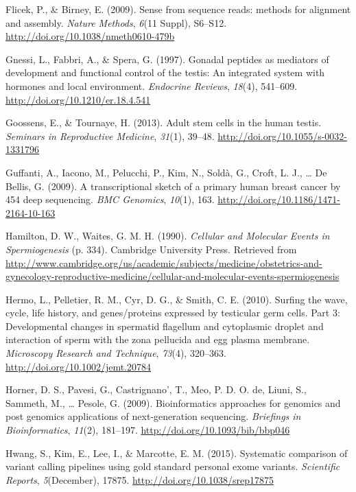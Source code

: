 \documentclass[12pt,twoside]{reedthesis}
\theoremstyle{definition}
\theoremstyle{definition}
\theoremstyle{remark}
\begin{document}
  \hypertarget{ref-Flicek2009}{}
  Flicek, P., \& Birney, E. (2009). Sense from sequence reads: methods for
  alignment and assembly. \emph{Nature Methods}, \emph{6}(11 Suppl),
  S6--S12. \url{http://doi.org/10.1038/nmeth0610-479b}
  
  \hypertarget{ref-Gnessi1997}{}
  Gnessi, L., Fabbri, A., \& Spera, G. (1997). Gonadal peptides as
  mediators of development and functional control of the testis: An
  integrated system with hormones and local environment. \emph{Endocrine
  Reviews}, \emph{18}(4), 541--609.
  \url{http://doi.org/10.1210/er.18.4.541}
  
  \hypertarget{ref-Goossens2013}{}
  Goossens, E., \& Tournaye, H. (2013). Adult stem cells in the human
  testis. \emph{Seminars in Reproductive Medicine}, \emph{31}(1), 39--48.
  \url{http://doi.org/10.1055/s-0032-1331796}
  
  \hypertarget{ref-Guffanti2009}{}
  Guffanti, A., Iacono, M., Pelucchi, P., Kim, N., Soldà, G., Croft, L.
  J., \ldots{} De Bellis, G. (2009). A transcriptional sketch of a primary
  human breast cancer by 454 deep sequencing. \emph{BMC Genomics},
  \emph{10}(1), 163. \url{http://doi.org/10.1186/1471-2164-10-163}
  
  \hypertarget{ref-Hamilton1987}{}
  Hamilton, D. W., Waites, G. M. H. (1990). \emph{Cellular and Molecular
  Events in Spermiogenesis} (p. 334). Cambridge University Press.
  Retrieved from
  \url{http://www.cambridge.org/us/academic/subjects/medicine/obstetrics-and-gynecology-reproductive-medicine/cellular-and-molecular-events-spermiogenesis}
  
  \hypertarget{ref-Hermo2010}{}
  Hermo, L., Pelletier, R. M., Cyr, D. G., \& Smith, C. E. (2010). Surfing
  the wave, cycle, life history, and genes/proteins expressed by
  testicular germ cells. Part 3: Developmental changes in spermatid
  flagellum and cytoplasmic droplet and interaction of sperm with the zona
  pellucida and egg plasma membrane. \emph{Microscopy Research and
  Technique}, \emph{73}(4), 320--363.
  \url{http://doi.org/10.1002/jemt.20784}
  
  \hypertarget{ref-Horner2009}{}
  Horner, D. S., Pavesi, G., Castrignano', T., Meo, P. D. O. de, Liuni,
  S., Sammeth, M., \ldots{} Pesole, G. (2009). Bioinformatics approaches
  for genomics and post genomics applications of next-generation
  sequencing. \emph{Briefings in Bioinformatics}, \emph{11}(2), 181--197.
  \url{http://doi.org/10.1093/bib/bbp046}
  
  \hypertarget{ref-Hwang2015}{}
  Hwang, S., Kim, E., Lee, I., \& Marcotte, E. M. (2015). Systematic
  comparison of variant calling pipelines using gold standard personal
  exome variants. \emph{Scientific Reports}, \emph{5}(December), 17875.
  \url{http://doi.org/10.1038/srep17875}
  
\end{document}
